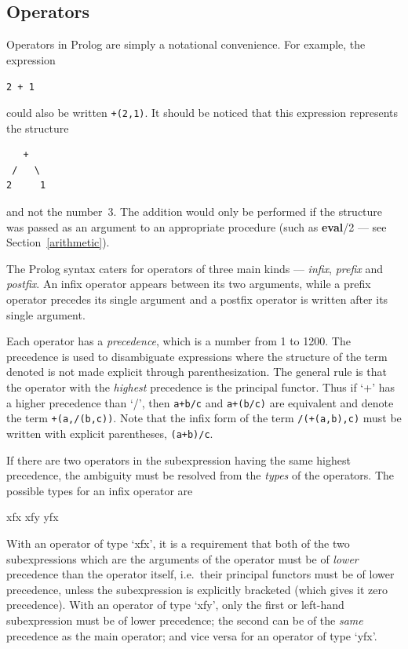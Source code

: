 \subsection{Operators}\label{operators}

Operators in Prolog are simply a notational convenience.
For example, the expression
\begin{center}
{\tt 2 + 1}
\end{center}
could also be written {\tt +(2,1)}.
It should be noticed that this expression represents the structure
\begin{center}
\begin{minipage}{.75in}
\begin{verbatim}
   +
 /   \
2     1
\end{verbatim}
\end{minipage}
\end{center}
and not the number~3.
The addition would only be performed if the structure was passed as an
argument to an appropriate procedure (such as {\bf eval}/2 --- see Section~\ref{arithmetic}).

The Prolog syntax caters for operators of three main kinds ---
{\em infix}, {\em prefix} and {\em postfix}.
An infix operator appears between its two arguments, while a prefix operator
precedes its single argument and a postfix operator is written after its
single argument.

Each operator has a {\em precedence}, which is a number from 1 to 1200.
The precedence is used to disambiguate
expressions where the structure of the term denoted is not made
explicit through parenthesization.
The general rule is that the operator with the
{\em highest} precedence is the principal functor.
Thus if `+' has a higher precedence than `/', then {\tt a+b/c} and {\tt a+(b/c)}
are equivalent and denote the term {\tt +(a,/(b,c))}.
Note that the infix form of the term {\tt /(+(a,b),c)}
must be written with explicit parentheses, {\tt (a+b)/c}.

If there are two operators in the subexpression having the same
highest precedence, the ambiguity must be resolved from the {\em types} of
the operators.
The possible types for an infix operator are
\begin{center}
{xfx     xfy     yfx}
\end{center}
With an operator of type `xfx', it is a requirement that both of the
two subexpressions which are the arguments of the operator must be of
{\em lower} precedence than the operator itself, i.e.\ their principal
functors must be of lower precedence, unless the subexpression is
explicitly bracketed (which gives it zero precedence).
With  an operator of type `xfy', only the first or left-hand subexpression must
be of lower precedence; the second can be of the {\em same} precedence as
the main operator; and vice versa for an operator of type `yfx'.

